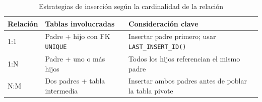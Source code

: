 \begin{table}[H]
  \centering
  \caption{Estrategias de inserción según la cardinalidad de la relación}
  \renewcommand{\arraystretch}{1.3}
  \begin{tabularx}{\textwidth}{l l X}
    \toprule
    \textbf{Relación} & \textbf{Tablas involucradas}     & \textbf{Consideración clave}                              \\
    \midrule
    1:1               & Padre + hijo con FK \texttt{UNIQUE} & Insertar padre primero; usar \texttt{LAST\_INSERT\_ID()}  \\
    1:N               & Padre + uno o más hijos          & Todos los hijos referencian el mismo padre                \\
    N:M               & Dos padres + tabla intermedia    & Insertar ambos padres antes de poblar la tabla pivote     \\
    \bottomrule
  \end{tabularx}
\end{table}